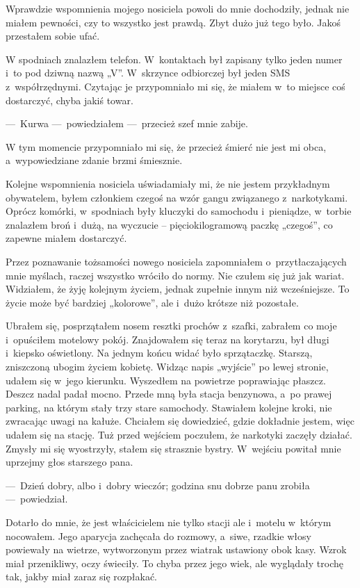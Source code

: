 Wprawdzie wspomnienia mojego nosiciela powoli do mnie dochodziły, jednak nie miałem pewności, czy to wszystko jest 
prawdą. Zbyt dużo już tego było. Jakoś przestałem sobie ufać.
 
W spodniach znalazłem telefon. W~kontaktach był zapisany tylko jeden numer i~to pod dziwną nazwą „V”. W~skrzynce 
odbiorczej był jeden SMS z~współrzędnymi. Czytając je przypomniało mi się, że miałem w~to miejsce coś dostarczyć, 
chyba jakiś towar.

---~Kurwa ---~powiedziałem ---~przecież szef mnie zabije. 

W tym momencie przypomniało mi się, że przecież śmierć nie jest mi obca, a~wypowiedziane zdanie brzmi śmiesznie.

Kolejne wspomnienia nosiciela uświadamiały mi, że nie jestem przykładnym obywatelem, byłem członkiem czegoś na wzór 
gangu związanego z~narkotykami. Oprócz komórki, w~spodniach były kluczyki do samochodu i~pieniądze, w~torbie 
znalazłem broń i~dużą, na wyczucie -- pięciokilogramową paczkę „czegoś”, co zapewne miałem dostarczyć. 

Przez poznawanie tożsamości nowego nosiciela zapomniałem o~przytłaczających mnie myślach, raczej wszystko wróciło do 
normy. Nie czułem się już jak wariat. Widziałem, że żyję kolejnym życiem, jednak zupełnie innym niż wcześniejsze. To 
życie może być bardziej „kolorowe”, ale i~dużo krótsze niż pozostałe.
 
Ubrałem się, posprzątałem nosem resztki prochów z~szafki, zabrałem co moje i~opuściłem motelowy pokój. Znajdowałem 
się teraz na korytarzu, był długi i~kiepsko oświetlony. Na jednym końcu widać było sprzątaczkę. Starszą, zniszczoną 
ubogim życiem kobietę. Widząc napis „wyjście” po lewej stronie, udałem się w~jego kierunku. Wyszedłem na powietrze 
poprawiając płaszcz. Deszcz nadal padał mocno. Przede mną była stacja benzynowa, a~po prawej parking, na którym stały 
trzy stare samochody. Stawiałem kolejne kroki, nie zwracając uwagi na kałuże. Chciałem się dowiedzieć, gdzie 
dokładnie jestem, więc udałem się na stację. Tuż przed wejściem poczułem, że narkotyki zaczęły działać. Zmysły mi się 
wyostrzyły, stałem się strasznie bystry. W~wejściu powitał mnie uprzejmy głos starszego pana.

---~Dzień dobry, albo i~dobry wieczór; godzina snu dobrze panu zrobiła ---~powiedział.
 
Dotarło do mnie, że jest właścicielem nie tylko stacji ale i~motelu w~którym nocowałem. Jego aparycja zachęcała do 
rozmowy, a~siwe, rzadkie włosy powiewały na wietrze, wytworzonym przez wiatrak ustawiony obok kasy. Wzrok miał 
przenikliwy, oczy świeciły. To chyba przez jego wiek, ale wyglądały trochę tak, jakby miał zaraz się rozpłakać.

